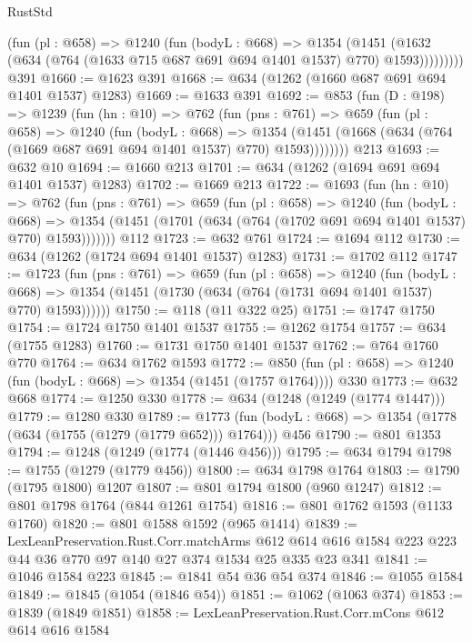\begin{lexlean}{RustStd}
\begin{coremodule}
            (fun (pl : @658) =>
            @1240
              (fun (bodyL : @668) =>
              @1354
                (@1451
                  (@1632 (@634 (@764 (@1633 @715 @687 @691 @694 @1401 @1537) @770) @1593)))))))))
    @391
@1660 := @1623 @391
@1668 := @634 (@1262 (@1660 @687 @691 @694 @1401 @1537) @1283)
@1669 := @1633 @391
@1692 := @853
    (fun (D : @198) =>
    @1239
      (fun (hn : @10) =>
      @762
        (fun (pns : @761) =>
        @659
          (fun (pl : @658) =>
          @1240
            (fun (bodyL : @668) =>
            @1354 (@1451 (@1668 (@634 (@764 (@1669 @687 @691 @694 @1401 @1537) @770) @1593))))))))
    @213
@1693 := @632 @10
@1694 := @1660 @213
@1701 := @634 (@1262 (@1694 @691 @694 @1401 @1537) @1283)
@1702 := @1669 @213
@1722 := @1693
    (fun (hn : @10) =>
    @762
      (fun (pns : @761) =>
      @659
        (fun (pl : @658) =>
        @1240
          (fun (bodyL : @668) =>
          @1354 (@1451 (@1701 (@634 (@764 (@1702 @691 @694 @1401 @1537) @770) @1593)))))))
    @112
@1723 := @632 @761
@1724 := @1694 @112
@1730 := @634 (@1262 (@1724 @694 @1401 @1537) @1283)
@1731 := @1702 @112
@1747 := @1723
    (fun (pns : @761) =>
    @659
      (fun (pl : @658) =>
      @1240
        (fun (bodyL : @668) =>
        @1354 (@1451 (@1730 (@634 (@764 (@1731 @694 @1401 @1537) @770) @1593))))))
@1750 := @118 (@11 @322 @25)
@1751 := @1747 @1750
@1754 := @1724 @1750 @1401 @1537
@1755 := @1262 @1754
@1757 := @634 (@1755 @1283)
@1760 := @1731 @1750 @1401 @1537
@1762 := @764 @1760 @770
@1764 := @634 @1762 @1593
@1772 := @850 (fun (pl : @658) => @1240 (fun (bodyL : @668) => @1354 (@1451 (@1757 @1764)))) @330
@1773 := @632 @668
@1774 := @1250 @330
@1778 := @634 (@1248 (@1249 (@1774 @1447)))
@1779 := @1280 @330
@1789 := @1773 (fun (bodyL : @668) => @1354 (@1778 (@634 (@1755 (@1279 (@1779 @652))) @1764))) @456
@1790 := @801 @1353
@1794 := @1248 (@1249 (@1774 (@1446 @456)))
@1795 := @634 @1794
@1798 := @1755 (@1279 (@1779 @456))
@1800 := @634 @1798 @1764
@1803 := @1790 (@1795 @1800) @1207
@1807 := @801 @1794 @1800 (@960 @1247)
@1812 := @801 @1798 @1764 (@844 @1261 @1754)
@1816 := @801 @1762 @1593 (@1133 @1760)
@1820 := @801 @1588 @1592 (@965 @1414)
@1839 := LexLeanPreservation.Rust.Corr.matchArms
    @612
    @614
    @616
    @1584
    @223
    @223
    @44
    @36
    @770
    @97
    @140
    @27
    @374
    @1534
    @25
    @335
    @23
    @341
@1841 := @1046 @1584 @223
@1845 := @1841 @54 @36 @54 @374
@1846 := @1055 @1584
@1849 := @1845 (@1054 (@1846 @54))
@1851 := @1062 (@1063 @374)
@1853 := @1839 (@1849 @1851)
@1858 := LexLeanPreservation.Rust.Corr.mCons @612 @614 @616 @1584

\end{coremodule}
\end{lexlean}
